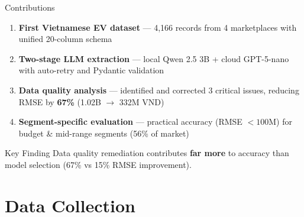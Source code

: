 \documentclass[aspectratio=169]{beamer}
\begin{document}
\begin{frame}{Contributions}
  \begin{enumerate}
    \item \textbf{First Vietnamese EV dataset} --- 4,166 records from 4 marketplaces with unified 20-column schema
    \item \textbf{Two-stage LLM extraction} --- local Qwen 2.5 3B + cloud GPT-5-nano with auto-retry and Pydantic validation
    \item \textbf{Data quality analysis} --- identified and corrected 3 critical issues, reducing RMSE by \textbf{67\%} (1.02B $\to$ 332M VND)
    \item \textbf{Segment-specific evaluation} --- practical accuracy (RMSE $< 100$M) for budget \& mid-range segments (56\% of market)
  \end{enumerate}

  \vspace{1em}
  \begin{alertblock}{Key Finding}
    Data quality remediation contributes \textbf{far more} to accuracy than model selection (67\% vs 15\% RMSE improvement).
  \end{alertblock}
\end{frame}

\section{Data Collection}
\end{document}
